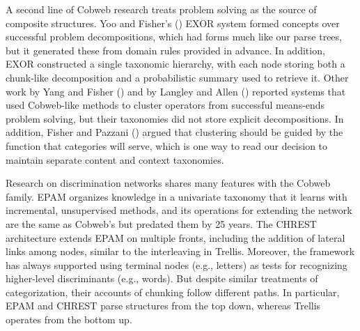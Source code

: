 \documentclass[11pt,letterpaper]{article}
\def\trellis/{{\sc Trellis}}
\begin{document}

A second line of Cobweb research treats problem solving as the source 
of composite structures. 
Yoo and Fisher's (\citeyear{yoo-fisher-explanations}) EXOR system 
formed concepts over successful problem decompositions, which
had forms much like our parse trees, but it generated these from 
domain rules provided in advance. In addition, EXOR constructed a 
single taxonomic hierarchy, with each node storing both a chunk-like 
decomposition and a probabilistic summary used to retrieve it. Other 
work by Yang and Fisher (\citeyear{yang-fisher-plans}) and by Langley 
and Allen (\citeyear{langley1993unified}) reported systems that used 
Cobweb-like methods to cluster operators from successful means-ends 
problem solving, but their taxonomies did not store explicit 
decompositions. In addition, Fisher and Pazzani 
(\citeyear{fisher-pazzani-theory-guided}) argued 
that clustering should be guided by the function that categories 
will serve, which is one way to read our decision to maintain 
separate content and context taxonomies.

Research on discrimination networks shares many features with the
Cobweb family. EPAM \citep{feigenbaum-epam, epam-richman} organizes 
knowledge in a univariate
taxonomy that it learns with incremental, unsupervised methods, and
its operations for extending the network are the same as Cobweb's
but predated them by 25 years. The CHREST architecture 
\citep{chrest-gobet-lane}
extends EPAM on multiple fronts, including the addition of lateral
links among nodes, similar to the interleaving in \trellis/. Moreover,
the framework has always supported using terminal nodes (e.g., letters) 
as tests for recognizing higher-level discriminants (e.g., words). 
But despite similar treatments of categorization, their accounts of
chunking follow different paths. In particular, EPAM and CHREST 
parse structures from the top down, whereas \trellis/ operates 
from the bottom up. 
\end{document}
